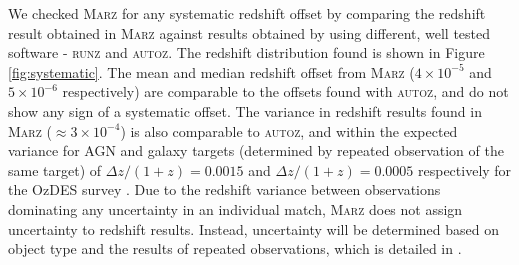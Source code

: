 \documentclass[5p]{elsarticle}
\newcommand{\runz}{\textsc{runz}}
\newcommand{\autoz}{\textsc{autoz}}
\newcommand{\marz}{\textsc{Marz}}
\begin{document}
We checked \marz{} for any systematic redshift offset by comparing the redshift result obtained in \marz{} against results obtained by using different, well tested software - \runz{} and \autoz{}. The redshift distribution found is shown in Figure \ref{fig:systematic}. The mean and median redshift offset from \marz{} ($4\times10^{-5}$ and $5\times10^{-6}$ respectively) are comparable to the offsets found with \autoz{}, and do not show any sign of a systematic offset. The variance in redshift results found in \marz{} ($\approx 3 \times 10^{-4}$) is also comparable to \autoz{}, and within the expected variance for AGN and galaxy targets (determined by repeated observation of the same target) of $\Delta z/(1+z) = 0.0015$ and $\Delta z/(1+z) = 0.0005$ respectively for the OzDES survey \citep{fang2015}. Due to the redshift variance between observations dominating any uncertainty in an individual match, \marz{} does not assign uncertainty to redshift results. Instead, uncertainty will be determined based on object type and the results of repeated observations, which is detailed in \citet[Table 4]{fang2015}.\\
\end{document}
